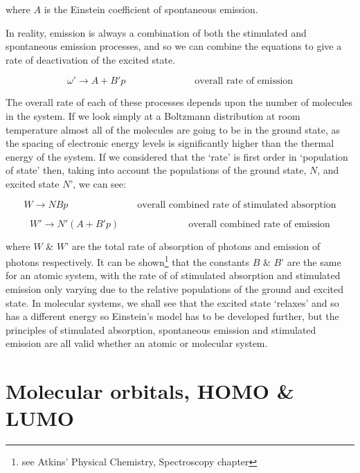 \documentclass[
]{book}
\begin{document}
where \(A\) is the Einstein coefficient of spontaneous emission.

In reality, emission is always a combination of both the stimulated and spontaneous emission processes, and so we can combine the equations to give a rate of deactivation of the excited state.

\begin{equation}
\omega ' \longrightarrow A + B'p \hspace{3cm} \textrm{overall rate of emission}
\label{eq:rateEm}
\end{equation}

The overall rate of each of these processes depends upon the number of molecules in the system. If we look simply at a Boltzmann distribution at room temperature almost all of the molecules are going to be in the ground state, as the spacing of electronic energy levels is significantly higher than the thermal energy of the system. If we considered that the `rate' is first order in `population of state' then, taking into account the populations of the ground state, \(N\), and excited state \(N’\), we can see:

\begin{equation}
W  \longrightarrow NBp \hspace{3cm} \textrm{overall combined rate of stimulated absorption}
\label{eq:totrateAbs}
\end{equation}

\begin{equation}
W ' \longrightarrow N'(A + B'p) \hspace{3cm} \textrm{overall combined rate of emission}
\label{eq:totrateEm}
\end{equation}

where \(W\) \& \(W’\) are the total rate of absorption of photons and emission of photons respectively.
It can be shown\footnote{see Atkins' Physical Chemistry, Spectroscopy chapter} that the constants \(B\) \& \(B’\) are the same for an atomic system, with the rate of of stimulated absorption and stimulated emission only varying due to the relative populations of the ground and excited state. In molecular systems, we shall see that the excited state `relaxes' and so has a different energy so Einstein's model has to be developed further, but the principles of stimulated absorption, spontaneous emission and stimulated emission are all valid whether an atomic or molecular system.

\hypertarget{sec:MOs}{%
\section{Molecular orbitals, HOMO \& LUMO}\label{sec:MOs}}
\end{document}
